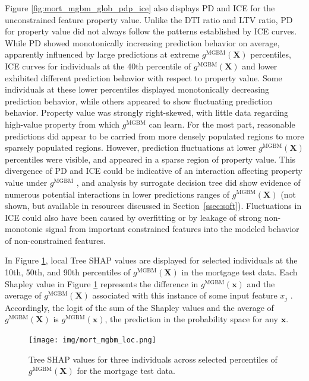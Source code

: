 \documentclass[information,article,accept,moreauthors,pdftex]{Definitions/mdpi}
\begin{document}
{{{Figure \ref{fig:mort_mgbm_glob_pdp_ice} also displays PD and ICE for the unconstrained feature property value. Unlike the DTI ratio and LTV ratio, PD for property value did not always follow the patterns established by ICE curves. While PD showed monotonically increasing prediction behavior on average, apparently influenced by large predictions at extreme $g^{\text{MGBM}}(\mathbf{X})$ percentiles, ICE curves for individuals at the 40{th} percentile of $g^{\text{MGBM}}(\mathbf{X})$ and lower exhibited different prediction behavior with respect to property value. Some individuals at these lower percentiles displayed monotonically decreasing prediction behavior, while others appeared to show fluctuating prediction behavior. Property value was strongly right-skewed, with little data regarding high-value property from which $g^{\text{MGBM}}$ can learn. For the most part, reasonable predictions did appear to be carried from more densely populated regions to more sparsely populated regions. However, prediction fluctuations at lower $g^{\text{MGBM}}(\mathbf{X})$ percentiles were visible, and appeared in a sparse region of property value. This divergence of PD and ICE could be indicative of an interaction affecting property value under $g^{\text{MGBM}}$ \cite{ice_plots}, and analysis by surrogate decision tree did show evidence of numerous potential interactions in lower predictions ranges of $g^{\text{MGBM}}(\mathbf{X})$ \cite{art_and_sci} (not shown, but available in resources discussed in Section~\ref{ssec:soft}). Fluctuations in ICE could also have been caused by overfitting or by leakage of strong non-monotonic signal from important constrained features into the modeled behavior of non-constrained features.

In Figure \ref{fig:mort_mgbm_loc}, local Tree SHAP values are displayed for selected individuals at the 10{th}, 50{th}, and 90{th} percentiles of $g^{\text{MGBM}}(\mathbf{X})$ in the mortgage test data. Each Shapley value in Figure \ref{fig:mort_mgbm_loc} represents the difference in $g^\text{MGBM}(\mathbf{x})$ and the average of $g^\text{MGBM}(\mathbf{X})$ associated with this instance of some input feature $x_j$ \cite{molnar}. Accordingly, the logit of the sum of the Shapley values and the average of $g^\text{MGBM}(\mathbf{X})$ is $g^\text{MGBM}(\mathbf{x})$, the prediction in the probability space for any $\mathbf{x}$. 

\begin{figure}[H]
\centering
\texttt{[image: img/mort\_mgbm\_loc.png]}
\caption{Tree SHAP values for three individuals across selected percentiles of $g^\text{MGBM}(\mathbf{X})$ for the mortgage test data.}
\label{fig:mort_mgbm_loc}
\end{figure}   

}}}
\end{document}
